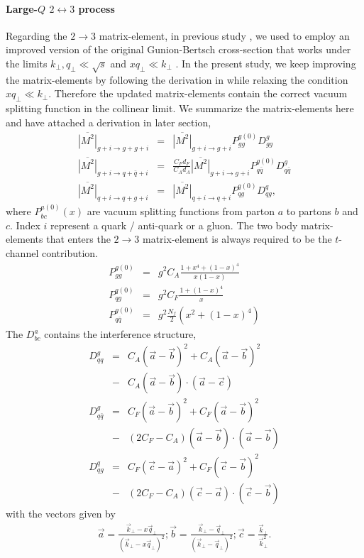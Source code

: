 \paragraph{Large-$Q$ $2\leftrightarrow 3$ process} 
Regarding the $2\rightarrow 3$ matrix-element, in previous study \cite{Ke:2018tsh}, we used to employ an improved version of the original Gunion-Bertsch cross-section that works under the limits $k_\perp, q_\perp \ll \sqrt{s}$ and $x q_\perp \ll k_\perp$ \cite{PhysRevD.25.746,Fochler:2013epa,Uphoff:2014hza}.
In the present study, we keep improving the matrix-elements by following the derivation in \cite{Fochler:2013epa} while relaxing the condition $x q_\perp \ll k_\perp$.
Therefore the updated matrix-elements contain the correct vacuum splitting function in the collinear limit.
We summarize the matrix-elements here and have attached a derivation in later section,
\begin{eqnarray}
\overline{|M^2|}_{g+i\rightarrow g+g+i} &=& \overline{|M^2|}_{g+i\rightarrow g+i} P_{gg}^{g(0)}  D_{gg}^{g}\\
\overline{|M^2|}_{g+i\rightarrow q+\bar{q}+i} &=& \frac{C_F d_F}{C_A d_A}\overline{|M^2|}_{g+i\rightarrow g+i} P_{q\bar{q}}^{g(0)} D_{q\bar{q}}^{g}\\
\overline{|M^2|}_{q+i\rightarrow q+g+i} &=& \overline{|M^2|}_{q+i\rightarrow q+i} P_{qg}^{q(0)} D_{qg}^{q},
\end{eqnarray}
where $P_{bc}^{a(0)}(x)$ are vacuum splitting functions from parton $a$ to partons $b$ and $c$. Index $i$ represent a quark / anti-quark or a gluon.
The two body matrix-elements that enters the $2\rightarrow 3$ matrix-element is always required to be the $t$-channel contribution.
\begin{eqnarray}
P_{gg}^{g(0)}  &=& g^2  C_A\frac{1+x^4+(1-x)^4}{x(1-x)}\\
P_{qg}^{q(0)} &=& g^2  C_F\frac{1+(1-x)^4}{x}\\
P_{q\bar{q}}^{g(0)} &=& g^2  \frac{N_f}{2}\left(x^2+(1-x)^4\right)
\end{eqnarray}
The $D_{bc}^{a}$ contains the interference structure,
\begin{eqnarray}
D_{qq}^{g} &=& 
C_A(\vec{a}-\vec{b})^2 + C_A(\vec{a}-\vec{b})^2 \\\nonumber
&-& C_A (\vec{a}-\vec{b})\cdot (\vec{a}-\vec{c})
\\
D_{q\bar{q}}^{g} &=& 
C_F(\vec{a}-\vec{b})^2 + C_F(\vec{a}-\vec{b})^2 \\\nonumber
&-& (2C_F-C_A) (\vec{a}-\vec{b})\cdot (\vec{a}-\vec{b})
\\
D_{qg}^{q} &=& 
C_F(\vec{c}-\vec{a})^2 + C_F(\vec{c}-\vec{b})^2 \\\nonumber
&-& (2C_F-C_A) (\vec{c}-\vec{a})\cdot (\vec{c}-\vec{b})
\end{eqnarray}
with the vectors given by
\begin{eqnarray}
\vec{a} = \frac{\vec{k}_\perp - x\vec{q}_\perp}{(\vec{k}_\perp - x\vec{q}_\perp)^2};
\vec{b} = \frac{\vec{k}_\perp - \vec{q}_\perp}{(\vec{k}_\perp - \vec{q}_\perp)^2};
\vec{c} =  \frac{\vec{k}_\perp}{\vec{k}_\perp^2}.
\end{eqnarray}


